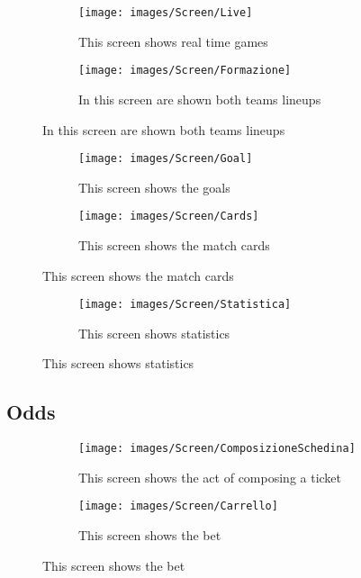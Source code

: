 \documentclass[numbers=noenddot, 12pt, a4paper, oneside]{scrbook}
\begin{document}
\begin{figure}[H]
	\begin{subfigure}{.5\textwidth}
		\centering
		\texttt{[image: images/Screen/Live]}
		\caption{This screen shows real time games}
	\end{subfigure}
	\begin{subfigure}{.5\textwidth}
		\centering
		\texttt{[image: images/Screen/Formazione]}
		\caption{In this screen are shown both teams lineups}
	\end{subfigure}
\end{figure}

\begin{figure}[H]
	\begin{subfigure}{.5\textwidth}
		\centering
		\texttt{[image: images/Screen/Goal]}
		\caption{This screen shows the goals}
	\end{subfigure}
	\begin{subfigure}{.5\textwidth}
		\centering
		\texttt{[image: images/Screen/Cards]}
		\caption{This screen shows the match cards}
	\end{subfigure}
\end{figure}

\begin{figure}[H]
	\centering
	\begin{subfigure}{.5\textwidth}
		\centering
		\texttt{[image: images/Screen/Statistica]}
		\caption{This screen shows statistics}
	\end{subfigure}
\end{figure}

\subsection*{Odds}

\begin{figure}[H]
	\begin{subfigure}{.5\textwidth}
		\centering
		\texttt{[image: images/Screen/ComposizioneSchedina]}
		\caption{This screen shows the act of composing a ticket}
	\end{subfigure}
	\begin{subfigure}{.5\textwidth}
		\centering
		\texttt{[image: images/Screen/Carrello]}
		\caption{This screen shows the bet}
	\end{subfigure}
\end{figure}
\end{document}
